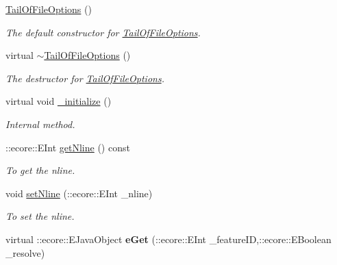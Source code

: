 \begin{DoxyCompactItemize}
\item 
\hypertarget{classFMS__Data_1_1TailOfFileOptions_abead830cdeada73f746cc34673d5afd4}{
\hyperlink{classFMS__Data_1_1TailOfFileOptions_abead830cdeada73f746cc34673d5afd4}{TailOfFileOptions} ()}
\label{classFMS__Data_1_1TailOfFileOptions_abead830cdeada73f746cc34673d5afd4}

\begin{DoxyCompactList}\small\item\em The default constructor for \hyperlink{classFMS__Data_1_1TailOfFileOptions}{TailOfFileOptions}. \item\end{DoxyCompactList}\item 
\hypertarget{classFMS__Data_1_1TailOfFileOptions_ae4e9b9928a722af279902960c652029b}{
virtual \hyperlink{classFMS__Data_1_1TailOfFileOptions_ae4e9b9928a722af279902960c652029b}{$\sim$TailOfFileOptions} ()}
\label{classFMS__Data_1_1TailOfFileOptions_ae4e9b9928a722af279902960c652029b}

\begin{DoxyCompactList}\small\item\em The destructor for \hyperlink{classFMS__Data_1_1TailOfFileOptions}{TailOfFileOptions}. \item\end{DoxyCompactList}\item 
\hypertarget{classFMS__Data_1_1TailOfFileOptions_a2ebe9e4041e65292d3a9820a68547814}{
virtual void \hyperlink{classFMS__Data_1_1TailOfFileOptions_a2ebe9e4041e65292d3a9820a68547814}{\_\-initialize} ()}
\label{classFMS__Data_1_1TailOfFileOptions_a2ebe9e4041e65292d3a9820a68547814}

\begin{DoxyCompactList}\small\item\em Internal method. \item\end{DoxyCompactList}\item 
::ecore::EInt \hyperlink{classFMS__Data_1_1TailOfFileOptions_af1d0620c6677d62e3c636962e2d57553}{getNline} () const 
\begin{DoxyCompactList}\small\item\em To get the nline. \item\end{DoxyCompactList}\item 
void \hyperlink{classFMS__Data_1_1TailOfFileOptions_a786d909e2bd148c06b1dc261147641e6}{setNline} (::ecore::EInt \_\-nline)
\begin{DoxyCompactList}\small\item\em To set the nline. \item\end{DoxyCompactList}\item 
\hypertarget{classFMS__Data_1_1TailOfFileOptions_aae035d18253fee634fdb42a371c546c2}{
virtual ::ecore::EJavaObject {\bfseries eGet} (::ecore::EInt \_\-featureID,::ecore::EBoolean \_\-resolve)}
\label{classFMS__Data_1_1TailOfFileOptions_aae035d18253fee634fdb42a371c546c2}


\end{DoxyCompactItemize}
